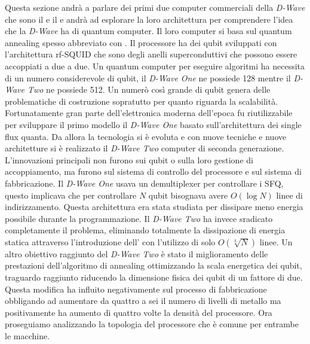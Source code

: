 Questa sezione andrà a parlare dei primi due computer commerciali della \textit{D-Wave} che sono il  e il  e andrà ad esplorare la loro architettura per comprendere l'idea che la \textit{D-Wave} ha di quantum computer. Il loro computer si basa sul quantum annealing spesso abbreviato con . Il processore ha dei qubit sviluppati con l'architettura rf-SQUID che sono degli anelli superconduttivi che possono essere accoppiati a due a due. Un quantum computer per eseguire algoritmi ha necessita di un numero considerevole di qubit, il \textit{D-Wave One} ne possiede 128 mentre il \textit{D-Wave Two} ne possiede 512. Un numerò così grande di qubit genera delle problematiche di costruzione sopratutto per quanto riguarda la scalabilità. Fortunatamente gran parte dell'elettronica moderna dell'epoca fu riutilizzabile per sviluppare il primo modello il \textit{D-Wave One} basato sull'architettura dei  single flux quanta. Da allora la tecnologia si è evoluta e con nuove tecniche e nuove architetture si è realizzato il \textit{D-Wave Two} computer di seconda generazione. L'innovazioni principali non furono sui qubit o sulla loro gestione di accoppiamento, ma furono sul sistema di controllo del processore e sul sistema di fabbricazione. Il \textit{D-Wave One} usava un demultiplexer per controllare i SFQ, questo implicava che per controllare $N$ qubit bisognava avere $O(\log{N})$ linee di indirizzamento. Questa architettura era stata studiata per dissipare meno energia possibile durante la programmazione. Il \textit{D-Wave Two} ha invece sradicato completamente il problema, eliminando totalmente la dissipazione di energia statica attraverso l'introduzione dell' con l'utilizzo di solo $O(\sqrt[3]{N})$ linee.
Un altro obiettivo raggiunto del \textit{D-Wave Two} è stato il miglioramento delle prestazioni dell'algoritmo di annealing ottimizzando la scala energetica dei qubit, traguardo raggiunto riducendo la dimensione fisica dei qubit di un fattore di due. Questa modifica ha influito negativamente sul processo di fabbricazione obbligando ad aumentare da quattro a sei il numero di livelli di metallo ma positivamente ha aumento di quattro volte la densità del processore. Ora proseguiamo analizzando la topologia del processore che è comune per entrambe le macchine.

